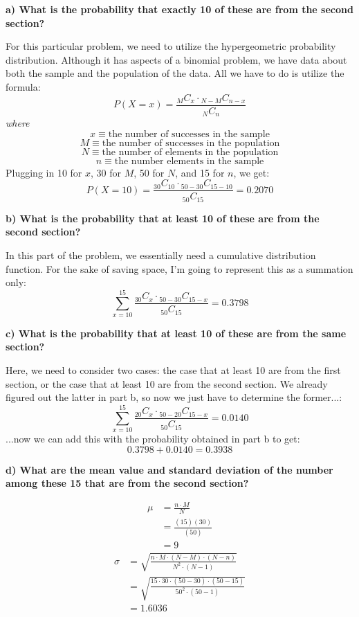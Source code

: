 \documentclass[12pt, letter]{article}
\begin{document}
\pagebreak

\qquad \textbf{a) What is the probability that exactly 10 of these are from the second section?}
\begin{center}
For this particular problem, we need to utilize the hypergeometric probability distribution. Although it has aspects of a binomial problem, we have data about both the sample and the population of the data. All we have to do is utilize the formula:
	$$P(X=x) = \frac{{}_{M}C_{x} \cdot {}_{N-M}C_{n-x}}{{}_{N}C_{n}}$$
	\textit{where}
	$$x \equiv \text{the number of successes in the sample}$$
	$$M \equiv \text{the number of successes in the population}$$
	$$N \equiv \text{the number of elements in the population}$$
	$$n \equiv \text{the number elements in the sample}$$
	Plugging in 10 for $x$, 30 for $M$, 50 for $N$, and 15 for $n$, we get:
	$$P(X=10) = \frac{{}_{30}C_{10} \cdot {}_{50-30}C_{15-10}}{{}_{50}C_{15}} = \boxed{0.2070}$$
\end{center}

\qquad \textbf{b) What is the probability that at least 10 of these are from the second section?}
\begin{center}
	In this part of the problem, we essentially need a cumulative distribution function. For the sake of saving space, I'm going to represent this as a summation only:
	$$\sum_{x=10}^{15} \frac{{}_{30}C_{x} \cdot {}_{50-30}C_{15-x}}{{}_{50}C_{15}} = \boxed{0.3798}$$
\end{center}

\pagebreak

\qquad \textbf{c) What is the probability that at least 10 of these are from the same section?}
\begin{center}
	Here, we need to consider two cases: the case that at least 10 are from the first section, or the case that at least 10 are from the second section. We already figured out the latter in part b, so now we just have to determine the former...:
	$$\sum_{x=10}^{15} \frac{{}_{20}C_{x} \cdot {}_{50-20}C_{15-x}}{{}_{50}C_{15}} = 0.0140$$
	...now we can add this with the probability obtained in part b to get:
	$$0.3798 + 0.0140 = \boxed{0.3938}$$
\end{center}

\qquad \textbf{d) What are the mean value and standard deviation of the number among these 15 that are from the second section?}
\begin{center}
	\begin{align*}
		\mu &= \frac{n \cdot M}{N} \\
		&= \frac{(15)(30)}{(50)} \\
		&= \boxed{9}
	\end{align*}
	\begin{align*}
		\sigma &= \sqrt{\frac{n \cdot M \cdot (N-M) \cdot (N-n)}{N^{2} \cdot (N-1)}} \\
		&= \sqrt{\frac{15 \cdot 30 \cdot (50-30) \cdot (50-15)}{50^{2} \cdot (50-1)}} \\
		&= \boxed{1.6036}
	\end{align*}
\end{center}
\end{document}
